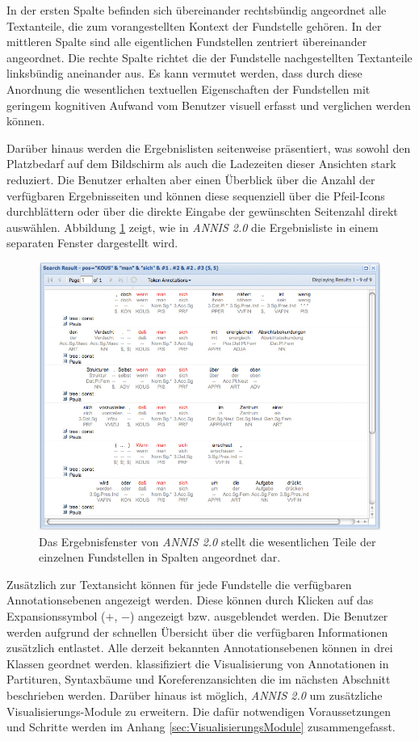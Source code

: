 In der ersten Spalte befinden sich übereinander rechtsbündig angeordnet alle Textanteile, die zum vorangestellten Kontext der Fundstelle gehören. In der mittleren Spalte sind alle eigentlichen Fundstellen zentriert übereinander angeordnet. Die rechte Spalte richtet die der Fundstelle nachgestellten Textanteile linksbündig aneinander aus. Es kann vermutet werden, dass durch diese Anordnung die wesentlichen textuellen Eigenschaften der Fundstellen mit geringem kognitiven Aufwand vom Benutzer visuell erfasst und verglichen werden können. 

Darüber hinaus werden die Ergebnislisten seitenweise präsentiert, was sowohl den Platzbedarf auf dem Bildschirm als auch die Ladezeiten dieser Ansichten stark reduziert. Die Benutzer erhalten aber einen Überblick über die Anzahl der verfügbaren Ergebnisseiten und können diese sequenziell über die Pfeil-Icons durchblättern oder über die direkte Eingabe der gewünschten Seitenzahl direkt auswählen. Abbildung \ref{fig:windowSearchResult} zeigt, wie in \emph{ANNIS 2.0} die Ergebnisliste in einem separaten Fenster dargestellt wird.

\begin{figure}[H]
	\centering
	\includegraphics*[width=1.0\textwidth]{figures/DA/windowSearchResult.jpg}
	\caption{Das Ergebnisfenster von \emph{ANNIS 2.0} stellt die wesentlichen Teile der einzelnen Fundstellen in Spalten angeordnet dar.}\label{fig:windowSearchResult}
\end{figure}

Zusätzlich zur Textansicht können für jede Fundstelle die verfügbaren Annotationsebenen angezeigt werden. Diese können durch Klicken auf das Expansionssymbol ($+$, $-$) angezeigt bzw. ausgeblendet werden. Die Benutzer werden aufgrund der schnellen Übersicht über die verfügbaren Informationen zusätzlich entlastet. Alle derzeit bekannten Annotationsebenen können in drei Klassen geordnet werden. \cite{futterleib2007} klassifiziert die Visualisierung von Annotationen in Partituren, Syntaxbäume und Koreferenzansichten die im nächsten Abschnitt beschrieben werden. Darüber hinaus ist möglich, \emph{ANNIS 2.0} um zusätzliche Visualisierungs-Module zu erweitern. Die dafür notwendigen Voraussetzungen und Schritte werden im Anhang \ref{sec:VisualisierungsModule} zusammengefasst. 

